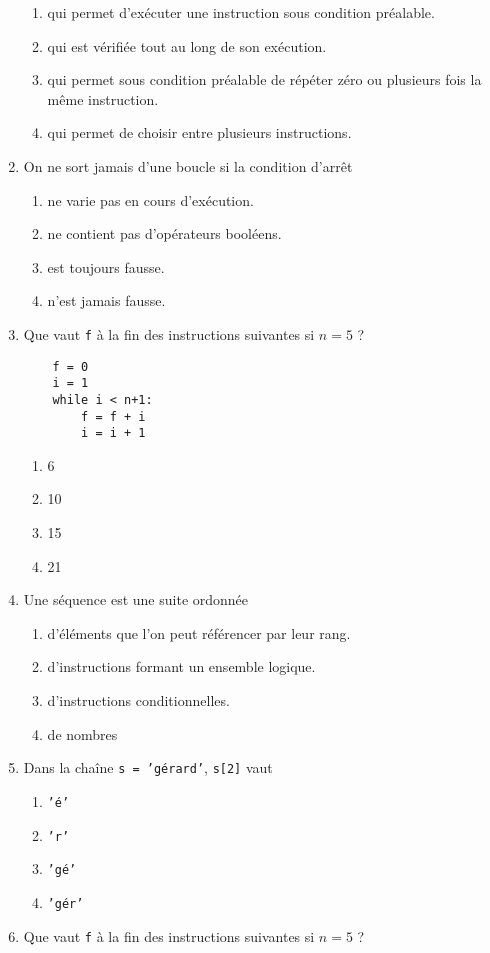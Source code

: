 \begin{td}[QCM (2)]
\begin{enumerate}
	\begin{enumerate}
	\item qui permet d'exécuter une instruction sous condition préalable.
	\item qui est vérifiée tout au long de son exécution. 
	\item qui permet sous condition préalable de répéter zéro ou plusieurs fois la même instruction.
	\item qui permet de choisir entre plusieurs instructions.
	\end{enumerate}
\item On ne sort jamais d'une boucle si la condition d'arrêt 
	\begin{enumerate}
	\item ne varie pas en cours d'exécution.
	\item ne contient pas d'opérateurs booléens.
	\item est toujours fausse.
	\item n'est jamais fausse.
	\end{enumerate}
\item Que vaut {\tt f} à la fin des instructions suivantes si $n = 5$ ?

	\begin{py}{4cm}
	\begin{verbatim}
	f = 0
	i = 1
	while i < n+1:
	    f = f + i
	    i = i + 1
	\end{verbatim}
	\end{py}

	\begin{enumerate}
	\item 6
	\item 10
	\item 15
	\item 21
	\end{enumerate}
\item Une séquence est une suite ordonnée 
	\begin{enumerate}
	\item d'éléments que l'on peut référencer par leur rang.
	\item d'instructions formant un ensemble logique.
	\item d'instructions conditionnelles.
	\item de nombres
	\end{enumerate}
\item Dans la chaîne {\tt s = 'gérard'}, {\tt s[2]} vaut
	\begin{enumerate}
	\item {\tt 'é'}
	\item {\tt 'r'}
	\item {\tt 'gé'}
	\item {\tt 'gér'}
	\end{enumerate}
\item Que vaut {\tt f} à la fin des instructions suivantes si $n = 5$ ?


\end{enumerate}
\end{td}
